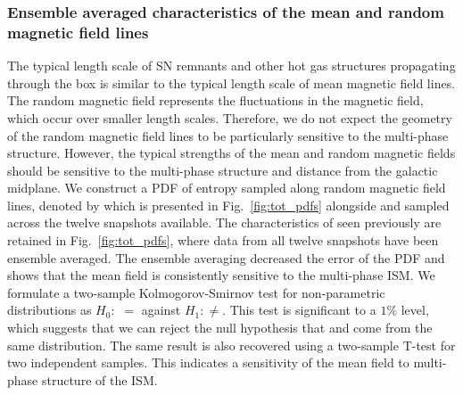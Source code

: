 \documentclass[useAMS,usenatbib]{mn2e}
\begin{document}
\subsubsection{Ensemble averaged characteristics of the mean and random magnetic field lines }
The typical length scale of SN remnants and other hot gas structures propagating through the box is
similar to the typical length scale of mean magnetic field lines. The random magnetic field
represents the fluctuations in the magnetic field, which occur over smaller length scales. 
Therefore, we do not expect the geometry of the random magnetic field lines to be particularly sensitive
to the multi-phase structure. However, the typical strengths of the mean and random magnetic fields should be sensitive 
to the multi-phase structure and distance from the galactic midplane.
We construct a PDF of entropy sampled along random magnetic field lines, denoted by \rnprs which is
presented in Fig.~\ref{fig:tot_pdfs} alongside \meanprs and \stprs sampled across the twelve snapshots available.
The characteristics of \meanprs seen previously are retained in Fig.~\ref{fig:tot_pdfs}, where data from all twelve snapshots have been ensemble averaged. The ensemble averaging decreased the error of the PDF and shows that the mean field is consistently sensitive to the multi-phase ISM. 
We formulate a two-sample Kolmogorov-Smirnov test for non-parametric distributions as $H_0:$  \stprs $=$ \meanprs against $H_1:$\stprs $\neq$\meanprs. This test is significant to a $1\%$  level, which suggests that we can reject the null hypothesis that \meanprs and \stprs come from the same distribution. The same result is also recovered using a two-sample T-test for two independent samples. This indicates a sensitivity of the mean field to multi-phase structure of the ISM. 
\end{document}
